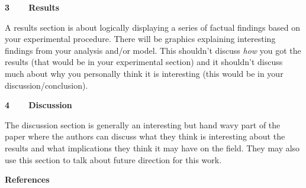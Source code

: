 \documentclass{article}
\begin{document}
\begin{multicols*}{2}
\begingroup
\begin{flushleft}
\fontsize{12pt}{12pt}
\textbf{3~~~~Results}
\end{flushleft}
\endgroup
\noindent
A results section is about logically displaying a series of factual findings based on your experimental procedure. There will be graphics explaining interesting findings from your analysis and/or model. This shouldn't discuss \textit{how} you got the results (that would be in your experimental section) and it shouldn't discuss much about why you personally think it is interesting (this would be in your discussion/conclusion). 


\begingroup
\begin{flushleft}
\fontsize{12pt}{12pt}
\textbf{4~~~~Discussion}
\end{flushleft}
\endgroup
\noindent
The discussion section is generally an interesting but hand wavy part of the paper where the authors can discuss what they think is interesting about the results and what implications they think it may have on the field. They may also use this section to talk about future direction for this work.


\begingroup
\begin{flushleft}
\fontsize{12pt}{12pt}
\textbf{References}
\end{flushleft}
\endgroup
\noindent
\vspace{-7mm}
{}


\end{multicols*}
\end{document}
